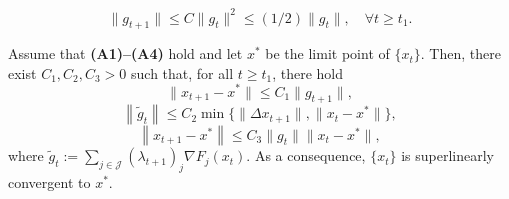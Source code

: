 \documentclass[10pt,a4paper]{amsart}
\newcommand{\J}{\mathcal{J}}
\begin{document}
\begin{equation} \label{ineq:contraction gt}
\|g_{t+1}\|\leq C\|g_t\|^2\leq (1/2)\|g_t\|, \quad \forall t\geq t_1.
\end{equation}

\begin{theorem}\label{theorem:superlinearconvergence}
Assume that {\bf (A1)--(A4)} hold and let $x^*$ be the limit point of $\{x_t\}$. Then,   there exist $C_1,C_2, C_3>0$ such that, for all $t\geq t_1$, there hold 
\begin{equation}\label{ineq:xi-xt<gt+1}
\|x_{t+1}-x^*\|\leq C_1\|g_{t+1}\| ,  
\end{equation} 
\begin{equation}\label{aux-eq: tilde gt}
  \left\|\tilde g_t\right\| \leq C_2 \min\{\|\Delta x_{t+1}\|, \|x_t-x^*\|\},
 \end{equation}
 \begin{equation}\label{ineq:xt+1-xbar leq gt xt-xbar}
  \left\|x_{t+1}-x^*\right\| \leq C_3 \|g_t\|\|x_t-x^*\|,
 \end{equation}
where $\tilde g_t:=\sum_{j\in \J} (\lambda_{t+1})_j\nabla F_j(x_t)$. As a consequence,  $\{x_t\}$ is superlinearly convergent  to $x^*$.
\end{theorem}
\end{document}
